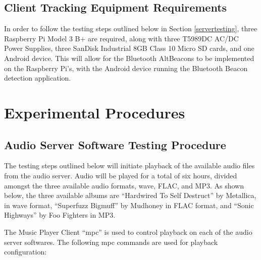 \documentclass[11pt,a4paper,headinclude=false,footinclude=false]{scrreprt}
\begin{document}
\subsection{Client Tracking Equipment
Requirements}\label{client-tracking-equipment-requirements}

In order to follow the testing steps outlined below in Section
\ref{servertesting}, three Raspberry Pi Model 3 B+ are required, along
with three T5989DC AC/DC Power Supplies, three SanDisk Industrial 8GB
Class 10 Micro SD cards, and one Android device. This will allow for the
Bluetooth AltBeacons to be implemented on the Raspberry Pi's, with the
Android device running the Bluetooth Beacon detection application.

\section{\texorpdfstring{Experimental Procedures
\label{expprocedure}}{Experimental Procedures }}\label{experimental-procedures}

\subsection{\texorpdfstring{Audio Server Software Testing Procedure
\label{servertesting}}{Audio Server Software Testing Procedure }}\label{audio-server-software-testing-procedure}

The testing steps outlined below will initiate playback of the available
audio files from the audio server. Audio will be played for a total of
six hours, divided amongst the three available audio formats, wave,
FLAC, and MP3. As shown below, the three available albums are
``Hardwired To Self Destruct'' by Metallica, in wave format, ``Superfuzz
Bigmuff'' by Mudhoney in FLAC format, and ``Sonic Highways'' by Foo
Fighters in MP3.

The Music Player Client ``mpc'' is used to control playback on each of
the audio server softwares. The following mpc commands are used for
playback configuration:
\end{document}
